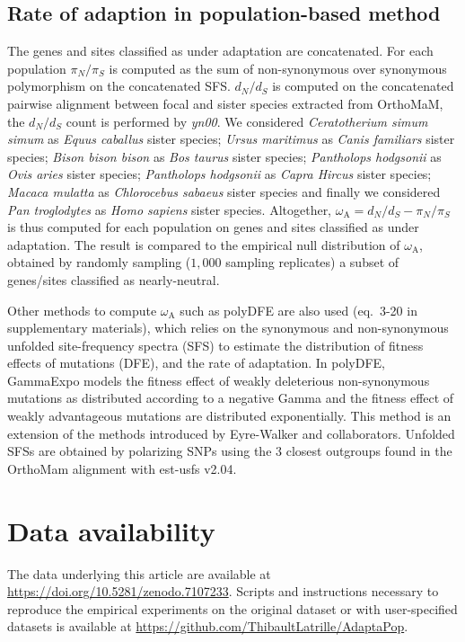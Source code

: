 \documentclass[9pt,twocolumn,twoside,lineno]{pnas-new}
\newcommand{\dn}{d_N}
\newcommand{\ds}{d_S}
\newcommand{\dnds}{\dn / \ds}
\newcommand{\rateApop}{\omega_{\mathrm{A}}}
\newcommand{\pn}{\pi_N}
\newcommand{\ps}{\pi_S}
\newcommand{\pnps}{\pn / \ps}
\begin{document}
{       \subsection*{Rate of adaption in population-based method}

       The genes and sites classified as under adaptation are concatenated.
       For each population $\pnps$ is computed as the sum of non-synonymous over synonymous polymorphism on the concatenated SFS\@.
       $\dnds$ is computed on the concatenated pairwise alignment between focal and sister species extracted from OrthoMaM, the $\dnds$ count is performed by \textit{yn00}.
       We considered \textit{Ceratotherium simum simum} as \textit{Equus caballus} sister species; \textit{Ursus maritimus} as \textit{Canis familiars} sister species; \textit{Bison bison bison} as \textit{Bos taurus} sister species; \textit{Pantholops hodgsonii} as \textit{Ovis aries} sister species; \textit{Pantholops hodgsonii} as \textit{Capra Hircus} sister species; \textit{Macaca mulatta} as \textit{Chlorocebus sabaeus} sister species and finally we considered \textit{Pan troglodytes} as \textit{Homo sapiens} sister species.
       Altogether, $\rateApop = \dnds - \pnps$ is thus computed for each population on genes and sites classified as under adaptation.
       The result is compared to the empirical null distribution of $\rateApop$, obtained by randomly sampling ($1,000$ sampling replicates) a subset of genes/sites classified as nearly-neutral.

       Other methods to compute $\rateApop$ such as polyDFE\cite{tataru_polydfe_2020} are also used (eq.~3-20 in supplementary materials), which relies on the synonymous and non-synonymous unfolded site-frequency spectra (SFS) to estimate the distribution of fitness effects of mutations (DFE), and the rate of adaptation.
       In polyDFE, GammaExpo models the fitness effect of weakly deleterious non-synonymous mutations as distributed according to a negative Gamma and the fitness effect of weakly advantageous mutations are distributed exponentially.
       This method is an extension of the methods introduced by Eyre-Walker and collaborators\cite{eyre-walker_distribution_2006, eyre-walker_estimating_2009}.
       Unfolded SFSs are obtained by polarizing SNPs using the $3$ closest outgroups found in the OrthoMam alignment with est-usfs v2.04\cite{keightley_inferring_2018}.

       \section{Data availability}\label{sec:data-availability}
       The data underlying this article are available at \url{https://doi.org/10.5281/zenodo.7107233}.
       Scripts and instructions necessary to reproduce the empirical experiments on the original dataset or with user-specified datasets is available at \url{https://github.com/ThibaultLatrille/AdaptaPop}.

}
\end{document}
